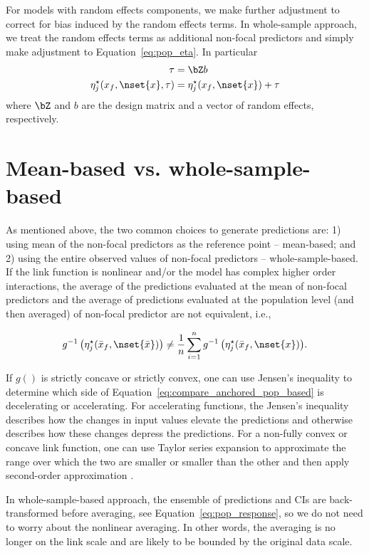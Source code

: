 For models with random effects components, we make further adjustment to correct for bias induced by the random effects terms. In whole-sample approach, we treat the random effects terms as additional non-focal predictors and simply make adjustment to Equation~\ref{eq:pop_eta}. In particular
%
\begin{align}\label{eq:pop_eta_re} 
\tau &= \bZ b \nonumber \\
\eta_j^\star(x_f, \nset{x}, \tau)  &= \eta_j^\star(x_f, \nset{x}) + \tau
\end{align}
where $\bZ$ and $b$ are the design matrix and a vector of random effects, respectively.

\section{Mean-based vs. whole-sample-based}

As mentioned above, the two common choices to generate predictions are: 1) using mean of the non-focal predictors as the reference point -- mean-based; and 2) using the entire observed values of non-focal predictors -- whole-sample-based. If the link function is nonlinear and/or the model has complex higher order interactions, the average of the predictions evaluated at the mean of non-focal predictors and the average of predictions evaluated at the population level (and then averaged) of non-focal predictor are not equivalent, i.e.,

\begin{align}\label{eq:compare_anchored_pop_based}
g^{-1} \left(\eta_j^\star(\bar{x}_f, \nset{\bar{x}})\right) \neq \frac{1}{n} \sum_{i=1}^n{ g^{-1} \left(\eta_j^\star(\bar{x}_f, \nset{x})\right)}.
\end{align}

If $g()$ is strictly concave or strictly convex, one can use Jensen's inequality to determine which side of Equation~\ref{eq:compare_anchored_pop_based} is decelerating or accelerating. For accelerating functions, the Jensen’s inequality describes how the changes in input values elevate the predictions and otherwise describes how these changes depress the predictions. For a non-fully convex or concave link function, one can use Taylor series expansion to approximate the range over which the two are smaller or smaller than the other and then apply second-order approximation \citep{hanmer2013behind}.

In whole-sample-based approach, the ensemble of predictions and CIs are back-transformed before averaging, see Equation~\ref{eq:pop_response}, so we do not need to worry about the nonlinear averaging. In other words, the averaging is no longer on the link scale and are likely to be bounded by the original data scale.

